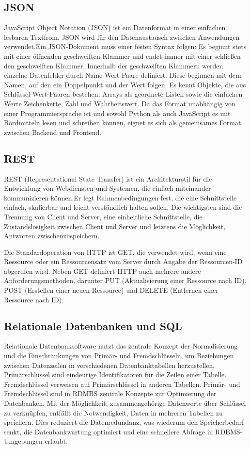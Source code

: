 \subsection{JSON}
JavaScript Object Notation (JSON) ist ein Datenformat in einer einfachen lesbaren
Textfrom. JSON wird für den Datenaustausch zwischen Anwendungen verwendet.Ein JSON-Dokument muss einer festen Syntax folgen: 
Es beginnt stets mit einer öffnenden ge­schweif­ten Klammer und endet immer mit einer schlie­ßen­den ge­schweif­ten Klammer.
Innerhalb der ge­schweif­ten Klammern werden einzelne Da­ten­fel­der durch Name-Wert-Paare definiert. Diese beginnen mit dem Namen,
auf den ein Dop­pel­punkt und der Wert folgen. 
Es kennt Objekte, die aus Schlüssel-Wert-Paaren bestehen,
Arrays als geordnete Listen sowie die einfachen Werte Zeichenkette, Zahl und
Wahrheitswert.
Da das Format unabhängig von
einer Programmiersprache ist und sowohl Python als auch JavaScript es mit
Bordmitteln lesen und schreiben können, eignet es sich als gemeinsames Format
zwischen Backend und Frontend. 

\subsection{REST}
REST (Representational State Transfer) ist ein Architekturstil für die Entwicklung von Webdiensten und Systemen,
die einfach miteinander kommunizieren können.Er legt Rahmenbedingungen fest, die eine Schnittstelle
einfach, skalierbar und leicht verständlich halten sollen. Die wichtigsten
sind die Trennung von Client und Server, eine einheitliche Schnittstelle, 
die Zustandslosigkeit zwischen Client und Server und letztens 
die Möglichkeit, Antworten zwischenzuspeichern. 

Die Standardoperation von HTTP ist GET, 
die verwendet wird, wenn eine Ressource oder ein Ressourcensatz vom Server durch Angabe der Ressourcen-ID abgerufen wird.
Neben GET definiert HTTP auch mehrere andere Anforderungsmethoden,
darunter PUT (Aktualisierung einer Ressource nach ID), POST (Erstellen einer neuen Ressource) 
und DELETE (Entfernen einer Ressource nach ID).

\subsection{Relationale Datenbanken und SQL}
Relationale Datenbanksoftware nutzt das zentrale Konzept der Normalisierung 
und die Einschränkungen von Primär- und Fremdschlüsseln, 
um Beziehungen zwischen Datenzeilen in verschiedenen Datenbanktabellen herzustellen. 
Primärschlüssel sind eindeutige Identifikatoren für die Zeilen einer Tabelle. 
Fremdschlüssel verweisen auf Primärschlüssel in anderen Tabellen.
Primär- und Fremdschlüssel sind in RDMBS zentrale Konzepte zur Optimierung der Datenbanken. 
Mit der Möglichkeit, zusammengehörige Datenwerte über Schlüssel zu verknüpfen, 
entfällt die Notwendigkeit, Daten in mehreren Tabellen zu speichern. 
Dies reduziert die Datenredundanz, was wiederum den Speicherbedarf senkt, 
die Datenbankwartung optimiert und eine schnellere Abfrage in RDBMS-Umgebungen erlaubt.

